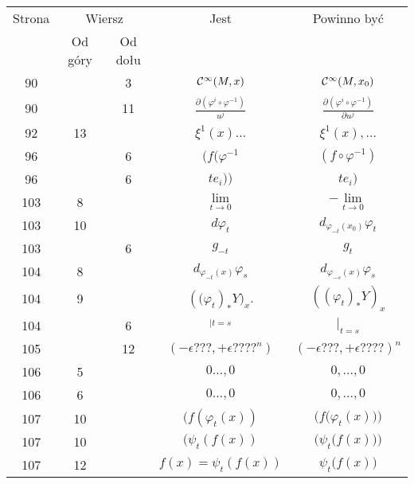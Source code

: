 \documentclass[a4paper,11pt]{article}
\begin{document}
\begin{center}
  \begin{tabular}{|c|c|c|c|c|}
    \hline
    Strona & \multicolumn{2}{c|}{Wiersz} & Jest
                              & Powinno być \\ \cline{2-3}
    & Od góry & Od dołu & & \\
    \hline
    \hphantom{0}90 & & \hphantom{0}3 & $\mathcal{C}^{ \infty }( M, x )$
    & $\mathcal{C}^{ \infty }( M, x_{ 0 } )$ \\
    \hphantom{0}90 & & 11 & $\frac{ \partial ( \varphi^{ i } \circ \varphi^{ -1 } ) }{ u^{ j } }$
           & $\frac{ \partial ( \varphi^{ i } \circ \varphi^{ -1 } ) }{ \partial u^{ j } }$ \\
    \hphantom{0}92 & 13 & & $\xi^{ 1 }( x ) \ldots$ & $\xi^{ 1 }( x ), \ldots$ \\
    \hphantom{0}96 & & \hphantom{0}6 & $( f ( \varphi^{ -1 }$
    & $( f \circ \varphi^{ -1 } )$ \\
    \hphantom{0}96 & & \hphantom{0}6 & $t e_{ i } ))$ & $t e_{ i } )$ \\
    103 & \hphantom{0}8 & & $\lim\limits_{ t \to 0 }$
           & $-\lim\limits_{ t \to 0 }$ \\
    103 & 10 & & $d \varphi_{ t }$ & $d_{ \varphi_{ -t }( x_{ 0 } ) } \varphi_{ t }$ \\
    103 & & \hphantom{0}6 & $g_{ -t }$ & $g_{ t }$ \\
    104 & \hphantom{0}8 & & $d_{ \varphi_{ -t }( x ) } \varphi_{ s }$
           & $d_{ \varphi_{ -s }( x ) } \varphi_{ s }$ \\
    104 & \hphantom{0}9 & & $( \big( \varphi_{ t } )_{*} Y \big)_{ x }$.
           & $( ( \varphi_{ t } )_{ * } Y )_{ x }$ \\
    104 & & \hphantom{0}6 & $_{ | t = s }$ & $|_{ t = s }$ \\
    105 & & 12 & $( - \epsilon???, + \epsilon????^{ n } )$ & $( -\epsilon???, +\epsilon???? )^{ n }$ \\
    106 & \hphantom{0}5 & & $0\ldots, 0$ & $0, \ldots, 0$ \\
    106 & \hphantom{0}6 & & $0\ldots, 0$ & $0, \ldots, 0$ \\
    107 & 10 & & $( f( \varphi_{ t }( x ) )$
    & $\Big( f\big( \varphi_{ t }( x ) \big) \Big)$ \\
    107 & 10 & & $( \psi_{ t } ( f( x ) )$
    & $\Big( \psi_{ t }\big( f( x ) \big) \Big)$ \\
    107 & 12 & & $f( x ) = \psi_{ t }( f( x ) )$
           & $\psi_{ t }\big( f( x ) \big)$ \\

\end{tabular}
\end{center}
\end{document}
